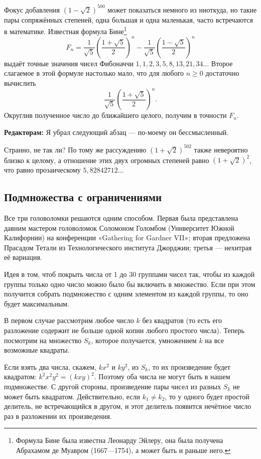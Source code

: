 Фокус добавления $(1-\sqrt{2})^{500}$ может показаться немного из ниоткуда, но такие пары сопряжённых степеней, одна большая и одна маленькая, часто встречаются в математике.
Известная формула Бине\footnote{Формула Бине была известна Леонарду Эйлеру, она была получена Абрахамом де Муавром (1667---1754), а может быть и раньше него.}
\[F_n=\frac{1}{\sqrt{5}}\left(\frac{1+\sqrt{5}}2\right)^n-\frac{1}{\sqrt{5}}\left(\frac{1-\sqrt{5}}2\right)^n\]
выдаёт точные значения чисел Фибоначчи $1, 1, 2, 3, 5, 8, 13, 21, 34 \dots$
Второе слагаемое в этой формуле настолько мало, что для любого $n \ge 0$ достаточно вычислить
\[\frac{1}{\sqrt{5}}\left(\frac{1+\sqrt{5}}2\right)^n.\]
Округлив полученное число до ближайшего целого, получим в точности $F_n$.

\begin{addedbytheeditors}
\textbf{Редакторам:}
Я убрал следующий абзац --- по-моему он бессмысленный.

Странно, не так ли?
По тому же рассуждению $(1+\sqrt{2})^{502}$ также невероятно близко к целому,
а отношение этих двух огромных степеней равно $(1+\sqrt{2})^{2}$, что равно прозаическому  $5{,}82842712\dots$
\end{addedbytheeditors}

\subsection*{Подмножества с ограничениями}

Все три головоломки решаются одним способом.
Первая была представлена давним мастером головоломок Соломоном Голомбом (Университет Южной Калифорнии) на конференции
«Ga\-the\-ring for Gard\-ner VII»;
вторая предложена Прасадом Тетали из Технологического института Джорджии;
третья --- нехитрая её вариация.

Идея в том, чтоб покрыть числа от 1 до 30 группами чисел так, чтобы из каждой группы только одно число можно было бы включить в множество.
Если при этом получится собрать подмножество с одним элементом из каждой группы, то оно будет максимальным.

В первом случае рассмотрим любое число $k$ без квадратов (то есть его разложение содержит не больше одной копии любого простого числа).
Теперь посмотрим на множество $S_k$, которое получается, умножением $k$ на все возможные квадраты.

Если взять два числа, скажем, $kx^2$ и $ky^2$, из $S_k$, то их произведение будет квадратом: $k^2x^2y^2 = (kxy)^2$.
Поэтому оба числа не могут быть в нашем подмножестве.
С другой стороны, произведение пары чисел из разных $S_k$ не может быть квадратом.
Действительно, если $k_1\ne k_2$, то у одного будет простой делитель, не встречающийся в другом, и этот делитель появится нечётное число раз в разложении их произведения.

